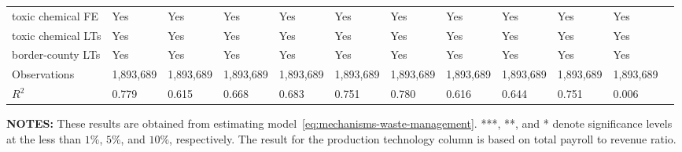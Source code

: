 \begin{table}[H]
{\begin{tabular}{@{}llllllllllll@{}}
            toxic chemical FE     & Yes       & Yes        & Yes          & Yes       & Yes       & Yes       & Yes        & Yes       & Yes       & Yes       \\
            toxic chemical LTs    & Yes       & Yes        & Yes          & Yes       & Yes       & Yes       & Yes        & Yes       & Yes       & Yes       \\
            border-county LTs     & Yes       & Yes        & Yes          & Yes       & Yes       & Yes       & Yes        & Yes       & Yes       & Yes       \\ \midrule
            Observations          & 1,893,689 & 1,893,689  & 1,893,689    & 1,893,689 & 1,893,689 & 1,893,689 & 1,893,689 & 1,893,689 & 1,893,689 & 1,893,689 \\
            $R^2$                 & 0.779     & 0.615      & 0.668        & 0.683     & 0.751     & 0.780     & 0.616      & 0.644     & 0.751     & 0.006     \\ \bottomrule\bottomrule
        \end{tabular}%
    }
    \begin{minipage}{\columnwidth}
        \vspace{0.05in}
        \tiny \textbf{NOTES:} These results are obtained from estimating model~\ref{eq:mechanisms-waste-management}. ***, **, and * denote significance levels at the less than $1\%$, $5\%$, and $10\%$, respectively. The result for the production technology column is based on total payroll to revenue ratio.
    \end{minipage}
\end{table}